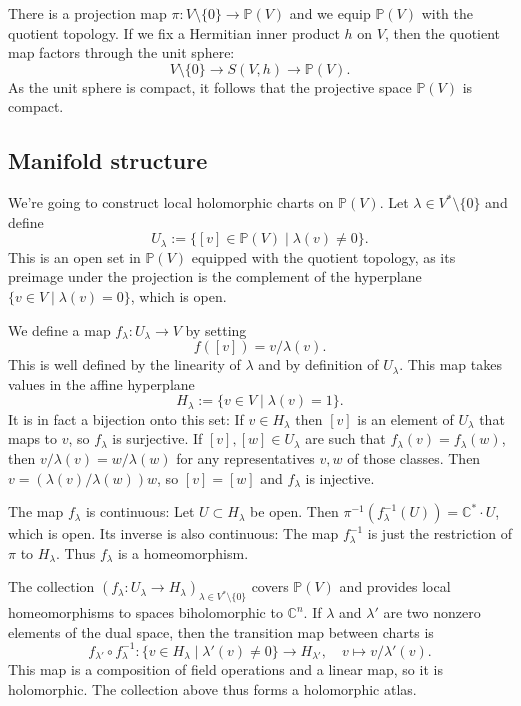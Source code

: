 \documentclass[11pt]{article}
\newcommand{\kk}[1]{\mathbb{#1}}
\begin{document}
There is a projection map $\pi : V \setminus \{0\} \to \kk P(V)$ and we equip $\kk P(V)$ with the quotient topology. If we fix a Hermitian inner product $h$ on $V$, then the quotient map factors through the unit sphere:
$$
V \setminus \{0\} \to S(V, h) \to \kk P(V).
$$
As the unit sphere is compact, it follows that the projective space $\kk P(V)$ is compact.


\subsection{Manifold structure}

We're going to construct local holomorphic charts on $\kk P(V)$. Let $\lambda \in V^* \setminus \{0\}$ and define
$$
U_\lambda := \{ [v] \in \kk P(V) \mid \lambda(v) \not= 0 \}.
$$
This is an open set in $\kk P(V)$ equipped with the quotient topology, as its preimage under the projection is the complement of the hyperplane $\{v \in V \mid \lambda(v) = 0\}$, which is open.

We define a map $f_\lambda: U_\lambda \to V$ by setting
$$
f([v]) = v/\lambda(v).
$$
This is well defined by the linearity of $\lambda$ and by definition of $U_\lambda$. This map takes values in the affine hyperplane
$$
H_\lambda := \{ v \in V \mid \lambda(v) = 1 \}.
$$
It is in fact a bijection onto this set: If $v \in H_\lambda$ then $[v]$ is an element of $U_\lambda$ that maps to $v$, so $f_\lambda$ is surjective. If $[v], [w] \in U_\lambda$ are such that $f_\lambda(v) = f_\lambda(w)$, then $v/\lambda(v) = w/\lambda(w)$ for any representatives $v, w$ of those classes. Then $v = (\lambda(v)/\lambda(w)) w$, so $[v] = [w]$ and $f_\lambda$ is injective.

The map $f_\lambda$ is continuous: Let $U \subset H_\lambda$ be open. Then $\pi^{-1}(f_\lambda^{-1}(U)) = \kk C^* \cdot U$, which is open. Its inverse is also continuous: The map $f_\lambda^{-1}$ is just the restriction of $\pi$ to $H_\lambda$. Thus $f_\lambda$ is a homeomorphism.

The collection $(f_\lambda : U_\lambda \to H_\lambda)_{\lambda \in V^* \setminus \{0\}}$ covers $\kk P(V)$ and provides local homeomorphisms to spaces biholomorphic to $\kk C^n$. If $\lambda$ and $\lambda'$ are two nonzero elements of the dual space, then the transition map between charts is
$$
f_{\lambda'} \circ f_{\lambda}^{-1} : \{v \in H_\lambda \mid \lambda'(v) \not= 0 \} \to H_{\lambda'},
\quad
v \mapsto v/\lambda'(v).
$$
This map is a composition of field operations and a linear map, so it is holomorphic. The collection above thus forms a holomorphic atlas.
\end{document}
